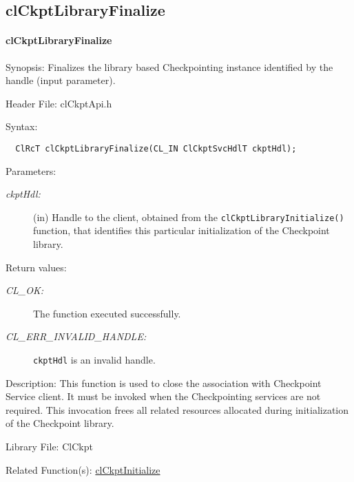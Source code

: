 \begin{flushleft}
\subsection{clCkptLibraryFinalize}
\hypertarget{pageckpt102}{}\paragraph{cl\-Ckpt\-Library\-Finalize}\label{pageckpt102}
\begin{Desc}
\item[Synopsis:]Finalizes the library based Checkpointing instance identified by the handle (input parameter). \end{Desc}
\begin{Desc}
\item[Header File:]clCkptApi.h\end{Desc}
\begin{Desc}
\item[Syntax:]

\footnotesize\begin{verbatim}  ClRcT clCkptLibraryFinalize(CL_IN ClCkptSvcHdlT ckptHdl);
\end{verbatim}
\normalsize
\end{Desc}
\begin{Desc}
\item[Parameters:]
\begin{description}
\item[{\em ckptHdl:}](in) Handle to the client, obtained from the {\tt{clCkptLibraryInitialize()}} function, that identifies this particular initialization of 
the Checkpoint library.\end{description}
\end{Desc}
\begin{Desc}
\item[Return values:]
\begin{description}
\item[{\em CL\_\-OK:}]The function executed successfully.
\item[{\em CL\_\-ERR\_\-INVALID\_\-HANDLE:}]{\tt{ckptHdl}} is an invalid handle.
\end{description}
\end{Desc}
\begin{Desc}
\item[Description:]This function is used to close the association with Checkpoint Service client. It must be invoked when the Checkpointing services are
not required. This invocation frees all related resources allocated during initialization of the Checkpoint library. 
\end{Desc}
\begin{Desc}
\item[Library File:]Cl\-Ckpt\end{Desc}
\begin{Desc}
\item[Related Function(s):]\hyperlink{pageckpt101}{cl\-Ckpt\-Initialize} \end{Desc}
\newpage




\end{flushleft}
